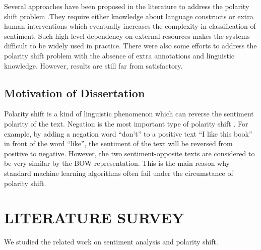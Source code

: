 \documentclass[oneside,a4paper,12pt]{pictreport}
\begin{document}
\par Several approaches have been proposed in the literature
to address the polarity shift problem .They require either knowledge about language constructs or
extra human interventions which eventually increases the complexity in classification of sentiment.  Such
high-level dependency on external resources makes the systems 
difficult to be widely used in practice. There were also
some efforts to address the polarity shift problem with the
absence of extra annotations and linguistic knowledge. However, results are still far from satisfactory.
\section{Motivation of Dissertation}
Polarity shift is a kind of linguistic phenomenon which can reverse the sentiment polarity of the text. Negation is
the most important type of polarity shift \cite{xiaOriginal}. For example, by adding a negation word “don’t” to a positive text “I like
this book” in front of the word “like”, the sentiment of the
text will be reversed from positive to negative. However, the two sentiment-opposite texts are considered to be
very similar by the BOW representation. This is the main reason why standard machine learning algorithms often
fail under the circumstance of polarity shift.


\chapter{LITERATURE SURVEY}

We studied the related work on sentiment analysis and
polarity shift.
\end{document}
